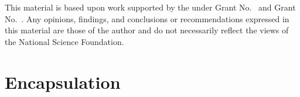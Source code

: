 \documentclass[acmsmall,review,anonymous]{acmart}\settopmatter{printfolios=true,printccs=false,printacmref=false}
\begin{document}
%


\begin{acks}                            %
  This material is based upon work supported by the
   under Grant
  No.~ and Grant
  No.~.  Any opinions, findings, and
  conclusions or recommendations expressed in this material are those
  of the author and do not necessarily reflect the views of the
  National Science Foundation.
\end{acks}





\appendix
\appendix


\section{Encapsulation}

\end{document}
